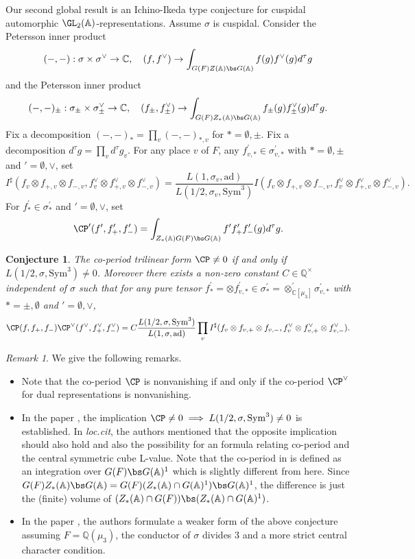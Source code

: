 \documentclass[11pt,reqno]{amsart}
\newcommand{\BA}{{\mathbb {A}}} \newcommand{\BB}{{\mathbb {B}}}
\newcommand{\BC}{{\mathbb {C}}} \newcommand{\BD}{{\mathbb {D}}}
\newcommand{\BQ}{{\mathbb {Q}}} \newcommand{\BR}{{\mathbb {R}}}
\newcommand{\ad}{{\mathrm{ad}}}\newcommand{\al}{{\mathrm{al}}}
\newcommand{\Sym}{{\mathrm{Sym}}}\newcommand{\sgn}{{\mathrm{sgn}}}
\theoremstyle{plain}
\newtheorem {conj}[thm]{Conjecture}
\theoremstyle{remark} \newtheorem{remark}[thm]{Remark}
\theoremstyle{definition} \newtheorem{exercise}[thm]{Exercise}
\theoremstyle{definition} \newtheorem{example}[thm]{Example} \newtheorem{condition}[thm]{Condition}
\numberwithin{equation}{section}
\renewcommand{\-}{\text{--}}
\begin{document}
Our second global result is an  Ichino-Ikeda type conjecture for  cuspidal automorphic $\GL_2(\BA)$-representations. Assume $\sigma$ is cuspidal. Consider the Petersson inner product  \[(-,-): \sigma\times\sigma^\vee\to\BC,\quad  (f,f^\vee)\to\int_{G(F)Z(\BA)\bs G(\BA)}f(g)f^\vee(g)d^\tau g\]
and the Petersson inner product 
 \[(-,-)_\pm: \sigma_\pm\times\sigma_\pm^\vee\to\BC,\quad  (f_\pm,f_\pm^\vee)\to\int_{G(F)Z_*(\BA)\bs G(\BA)}f_\pm(g)f_\pm^\vee(g)d^\tau g.\]
Fix a decomposition $(-,-)_*=\prod_v(-,-)_{*,v}$ for $*=\emptyset,\pm$. Fix a decomposition $d^\tau g=\prod_v d^\tau g_v$. For any place $v$ of $F$, any $f_{v,*}^\prime\in\sigma_{v,*}^\prime$ with $*=\emptyset,\pm$ and $\prime=\emptyset,\vee$, set 
\[I^\sharp(f_v\otimes f_{+,v}\otimes f_{-,v},f_v^\vee\otimes f_{+,v}^\vee\otimes f_{-,v}^\vee)
=\frac{L(1,\sigma_v,\ad)}{L(1/2,\sigma_v,\Sym^3)}I(f_v\otimes f_{+,v}\otimes f_{-,v},f_v^\vee\otimes f_{+,v}^\vee\otimes f_{-,v}^\vee).\]
For $f_*^\prime\in\sigma_*^\prime$ and $\prime=\emptyset,\vee$, set \[\CP^\prime(f^\prime,f_+^\prime,f_-^\prime)=\int_{Z_*(\BA)G(F)\bs G(\BA)}f^\prime f_+^\prime f^\prime_-(g)d^\tau g.\]
\begin{conj}\label{co-period-conj}The co-period  trilinear  form $\CP\neq0$ if and only if $L(1/2,\sigma,\Sym^3)\neq0$.
Moreover there exists a non-zero constant $C\in\BQ^\times$ independent of $\sigma$ such that  for any pure tensor $f_*^\prime=\otimes f_{v,*}^\prime\in\sigma_*^\prime=\otimes_{\BC[\mu_3]}^\prime \sigma_{v,*}^\prime $ with $*=\pm,\emptyset$ and $\prime=\emptyset,\vee$, 
\[\CP(f,f_+,f_-)\CP^\vee(f^\vee,f_+^\vee,f_-^\vee)=C\frac{L(1/2,\sigma,\Sym^3)}{L(1,\sigma,\ad)}\prod_v I^\sharp(f_v\otimes f_{v,+}\otimes f_{v,-},f_v^\vee\otimes f_{v,+}^\vee\otimes f_{v,-}^\vee).\]
\end{conj}
\begin{remark} 
We give the following remarks.
\begin{itemize}
 \item Note that the co-period $\CP$ is nonvanishing if and only if the co-period $\CP^\vee$ for dual representations is nonvanishing.
 \item In the paper \cite{GJR01}, the implication $\CP\neq0\implies L(1/2, \sigma,\Sym^3)\neq0$ is established. In \textit{loc.cit}, the authors mentioned  that the opposite implication should also hold and also the possibility for an formula relating co-period and the central symmetric cube L-value. Note that the co-period in \cite{GJR01} is defined as an integration over $G(F) \bs G(\BA)^1$ which is slightly different from here. Since $G(F) Z_*(\BA) \bs G(\BA) = G(F)(Z_*(\BA) \cap G(\BA)^1) \bs G(\BA)^1$, the difference is just
 the (finite) volume of $(Z_*(\BA) \cap G(F)) \bs (Z_*(\BA) \cap G(\BA)^1)$.
 \item In the paper \cite{HJL23}, the authors formulate a weaker form of the above conjecture assuming $F=\BQ(\mu_3)$, the conductor of $\sigma$ divides $3$ and  a more strict central character condition.
 \end{itemize}
\end{remark}
\end{document}
